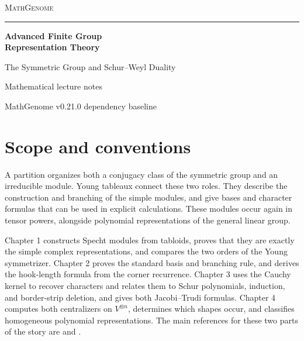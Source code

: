 \documentclass[11pt,oneside,openany]{book}
\theoremstyle{definition}
\theoremstyle{remark}
\begin{document}
\frontmatter
\hypersetup{pageanchor=false}
\begin{titlepage}
\thispagestyle{empty}
\begin{flushleft}
\vspace*{0.65in}
{\large\scshape\color{deepgreen}MathGenome\par}
\vspace{0.35in}
{\color{rulegreen}\rule{0.94\textwidth}{0.65pt}\par}
\vspace{0.43in}
{\color{ink}\fontsize{36}{42}\selectfont\bfseries
Advanced Finite Group\\[4pt] Representation Theory\par}
\vspace{0.32in}
{\color{deepgreen}\Large The Symmetric Group and Schur--Weyl Duality\par}
\vfill
{\large Mathematical lecture notes\par}
\vspace{0.10in}
{\normalsize MathGenome v0.21.0 dependency baseline\par}
\vspace*{0.45in}
\end{flushleft}
\end{titlepage}
\hypersetup{pageanchor=true}

\tableofcontents

\chapter*{Scope and conventions}

A partition organizes both a conjugacy class of the symmetric group
and an irreducible module. Young tableaux connect these two roles.
They describe the construction and branching of the simple modules,
and give bases and character formulas that can be used in explicit
calculations. These modules occur again in tensor powers, alongside
polynomial representations of the general linear group.

Chapter 1 constructs Specht modules from tabloids, proves that they
are exactly the simple complex representations, and compares the
two orders of the Young symmetrizer. Chapter 2 proves the standard
basis and branching rule, and derives the hook-length formula from
the corner recurrence. Chapter 3 uses the Cauchy kernel to recover
characters and relates them to Schur polynomials, induction, and
border-strip deletion, and gives both Jacobi--Trudi formulas.
Chapter 4 computes both centralizers on
\(V^{\otimes n}\), determines which shapes occur, and classifies
homogeneous polynomial representations. The main references for
these two parts of the story are \cite[Chapters 2--4]{sagan} and
\cite[Sections 4.12--4.22]{etingof}.
\end{document}
